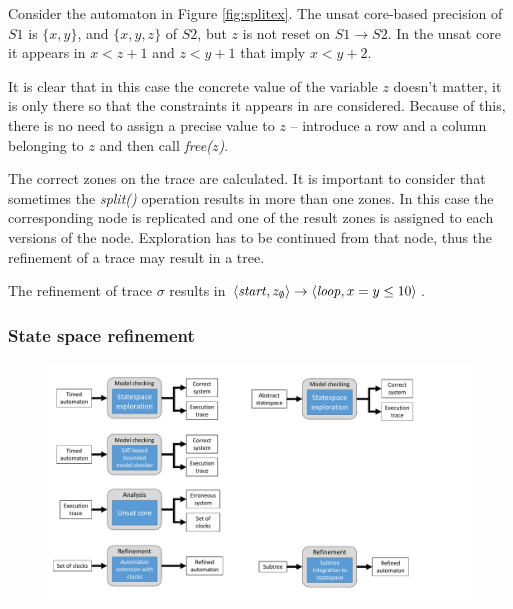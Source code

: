 \begin{example}
	Consider the automaton in Figure \ref{fig:splitex}. The unsat core-based precision of $S1$ is $\{x,y\}$, and $\{x,y,z\}$ of $S2$, but $z$ is not reset on $S1 \to S2$. In the unsat core it appears in $x < z+1$ and $z < y+1$ that imply $x < y+2$.
\end{example}

It is clear that in this case the concrete value of the variable $z$ doesn't matter, it is only there so that the constraints it appears in are considered. Because of this, there is no need to assign a precise value to $z$ -- introduce a row and a column belonging to $z$ and then call \emph{free($z$)}.

The correct zones on the trace are calculated. It is important to consider that sometimes the \emph{split()} operation results in more than one zones. In this case the corresponding node is replicated and one of the result zones is assigned to each versions of the node. Exploration has to be continued from that node, thus the refinement of a trace may result in a tree.

\begin{runningExample}
	The refinement of trace $\sigma$ results in $\langle \text{\emph{start}}, z_\emptyset \rangle \to \langle \text{\emph{loop}}, x=y \leq 10 \rangle$.
\end{runningExample}



\subsubsection{State space refinement}

\begin{figure}[h]
	\centering
	\includegraphics[width=.7\textwidth]{include/figures/modules_ssp_ref}
\end{figure}


